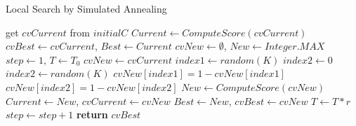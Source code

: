 \begin{algorithm}[th]
\caption{Local Search by Simulated Annealing}
\label{local_search}
\begin{algorithmic}[1]


\State get $cvCurrent$ from $initialC$
\State $Current \leftarrow ComputeScore(cvCurrent)$
\State $cvBest \leftarrow cvCurrent$, $Best  \leftarrow Current$
\State $cvNew \leftarrow \emptyset$, $New \leftarrow Integer.MAX$
\State $step \leftarrow 1$, $T \leftarrow T_0$
\State $cvNew\leftarrow cvCurrent$
\State $index1\leftarrow random(K)$
\State $index2\leftarrow 0$
\Repeat
\State $index2 \leftarrow random(K)$
\State $cvNew[index1]=1-cvNew[index1]$
\State $cvNew[index2]=1-cvNew[index2]$
\State $New\leftarrow ComputeScore(cvNew)$
\State $Current\leftarrow New$, $cvCurrent\leftarrow cvNew$
\EndIf
{}
\State $Best\leftarrow New$, $cvBest\leftarrow cvNew$
\EndIf
\State $T \leftarrow T*r$
\State $step\leftarrow step+1$
\EndWhile
\State \textbf{return} $cvBest$
\EndFunction
\end{algorithmic}
\end{algorithm}

